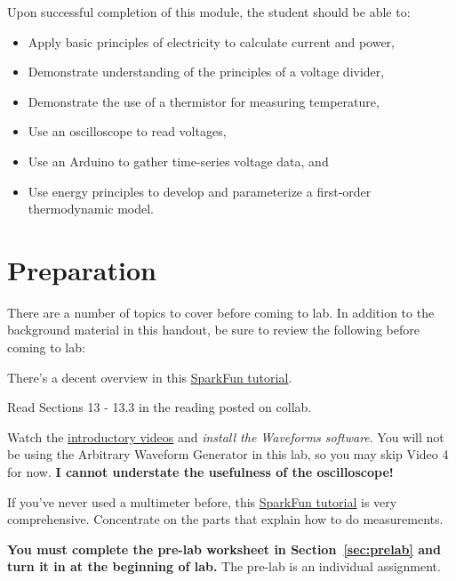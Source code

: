 \documentclass[11pt]{article} %
\begin{document}
Upon successful completion of this module, the student should be able to:
\begin{itemize}
\item Apply basic principles of electricity to calculate current and power,
\item Demonstrate understanding of the principles of a voltage divider,
\item Demonstrate the use of a thermistor for measuring temperature,
\item Use an oscilloscope to read voltages,
\item Use an Arduino to gather time-series voltage data, and
\item Use energy principles to develop and parameterize a first-order thermodynamic model.%
\end{itemize}

\section{Preparation}

There are a number of topics to cover before coming to lab. In addition to the background material in this handout, be sure to review the following before coming to lab:

\begin{description}
\item [Basic laws of circuits and resistive elements.] There’s a decent overview in this \href{https://learn.sparkfun.com/tutorials/resistors}{\underline{SparkFun tutorial}}.
\item [Thermistors.] Read Sections 13 - 13.3 in the reading posted on collab.
\item [Use of the Digilent Analog Discovery.] Watch the \href{https://www.youtube.com/playlist?list=PLSTiCUiN_BoJ0ZwU5wj73OO_7BI2NcihM}{\underline{introductory videos}} and \emph{install the Waveforms software}. You will not be using the Arbitrary Waveform Generator in this lab, so you may skip Video 4 for now. {\bf I cannot understate the usefulness of the oscilloscope!}
\item If you’ve never used a multimeter before, this \href{https://learn.sparkfun.com/tutorials/how-to-use-a-multimeter/}{\underline{SparkFun tutorial}} is very comprehensive. Concentrate on the parts that explain how to do measurements.
\end{description}
{\bf You must complete the pre-lab worksheet in Section~\ref{sec:prelab} and turn it in at the beginning of lab.} The pre-lab is an individual assignment.
\end{document}
